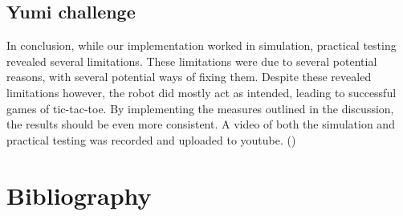 \documentclass[a4paper,12pt]{article}
\begin{document}
\subsection{Yumi challenge}
In conclusion, while our implementation worked in simulation, practical testing revealed several limitations.
These limitations were due to several potential reasons, with several potential ways of fixing them. Despite
these revealed limitations however, the robot did mostly act as intended, leading to successful games of
tic-tac-toe. By implementing the measures outlined in the discussion, the results should be even more consistent.
A video of both the simulation and practical testing was recorded and uploaded to youtube. (\cite{yumichallenge})
\section{Bibliography}
\printbibliography
\end{document}
